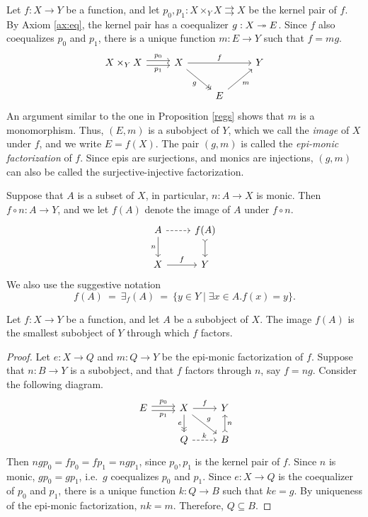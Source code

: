 Let $f:X\to Y$ be a function, and let $p_0,p_1:X\times
_YX\rightrightarrows X$ be the kernel pair of $f$.  By Axiom
\ref{ax:eq}, the kernel pair has a coequalizer $g:X\twoheadrightarrow E$.  Since $f$
also coequalizes $p_0$ and $p_1$, there is a unique function $m:E\to
Y$ such that $f=mg$.
\[ \begin{tikzcd}
  X\times _YX \arrow[r,shift left,"p_0"] \arrow[r,shift right,"p_1"'] & X \arrow[rr,"f"] \arrow[->>,rd,"g"'] & & Y \\
  & & E \arrow[ur,"m"'] \end{tikzcd} \] An argument similar to the one
in Proposition \ref{regs} shows that $m$ is a monomorphism.  Thus,
$(E,m)$ is a subobject of $Y$, which we call the \emph{image} of $X$
under $f$, and we write $E=f(X)$.  The pair $(g,m)$ is called the
\emph{epi-monic factorization} of $f$.  Since epis are surjections,
and monics are injections, $(g,m)$ can also be called the
surjective-injective factorization.


\begin{defn} Suppose that $A$ is a subset of $X$, in particular,
  $n:A\to X$ is monic.  Then $f\circ n:A\to Y$, and we let $f(A)$
  denote the image of $A$ under $f\circ n$.
  \[ \begin{tikzcd}
    A \arrow[d,"n"'] \arrow[dashed,r] & f(A) \arrow[>->,d] \\
    X \arrow[r,"f"] & Y \end{tikzcd} \] We also use the suggestive
  notation
\[ f(A) \: = \: \exists _f(A) \: = \: \{ y\in Y \mid \exists x\in
A.f(x)=y \} . \] \end{defn}

\begin{prop} Let $f:X\to Y$ be a function, and let $A$ be a subobject
  of $X$. The image $f(A)$ is the smallest subobject of $Y$ through
  which $f$ factors. \label{image-smallest} \end{prop}

\begin{proof} Let $e:X\to Q$ and $m:Q\to Y$ be the epi-monic
  factorization of $f$.  Suppose that $n:B\to Y$ is a subobject, and
  that $f$ factors through $n$, say $f=ng$.  Consider the following
  diagram.
  \[ \begin{tikzcd} E \arrow[shift left=0.5ex]{r}[above]{p_0}
    \arrow[shift right=0.5ex]{r}[below]{p_1} & X \arrow{r}{f}
    \arrow[->>]{d}[left]{e}
    \arrow{dr}{g} & Y \\
    & Q \arrow[dashed]{r}{k} & B
    \arrow[>->]{u}[right]{n} \end{tikzcd} \] Then
  $ngp_0=fp_0=fp_1=ngp_1$, since $p_0,p_1$ is the kernel pair of $f$.
  Since $n$ is monic, $gp_0=gp_1$, i.e.\ $g$ coequalizes $p_0$ and
  $p_1$.  Since $e:X\to Q$ is the coequalizer of $p_0$ and $p_1$,
  there is a unique function $k:Q\to B$ such that $ke=g$.  By
  uniqueness of the epi-monic factorization, $nk=m$.  Therefore,
  $Q\subseteq B$.
\end{proof}




